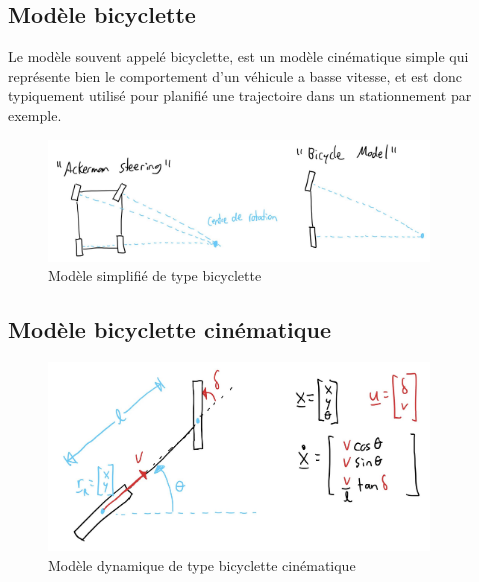 \subsection{Modèle bicyclette}

Le modèle souvent appelé bicyclette, est un modèle cinématique simple qui représente bien le comportement d'un véhicule a basse vitesse, et est donc typiquement utilisé pour planifié une trajectoire dans un stationnement par exemple.
\begin{figure}[htbp]
	\centering
		\includegraphics[width=0.90\textwidth]{fig/ackerman.jpg}
	\caption{Modèle simplifié de type bicyclette}
	\label{fig:ackerman}
\end{figure}

\subsection{Modèle bicyclette cinématique}

\begin{figure}[htbp]
	\centering
		\includegraphics[width=0.90\textwidth]{fig/bicyclemodel.jpg}
	\caption{Modèle dynamique de type bicyclette cinématique}
	\label{fig:bicyclemodel}
\end{figure}

